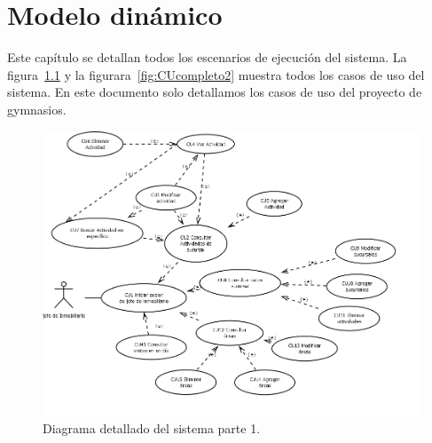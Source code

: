 \chapter{Modelo dinámico}	
\label{cap:modDinamico}

	Este capítulo se detallan todos los escenarios de ejecución del sistema. La figura~\ref{fig:CUcompleto1}  y la figurara~\ref{fig:CUcompleto2} muestra todos los casos de uso del sistema. En este documento solo detallamos los casos de uso del proyecto de gymnasios.

\begin{figure}[htbp]
	\begin{center}
		\includegraphics[angle=90, width=.7\textwidth]{images/CUcompleto1}
		\caption{Diagrama detallado del sistema parte 1.}
		\label{fig:CUcompleto1}
	\end{center}
\end{figure}

